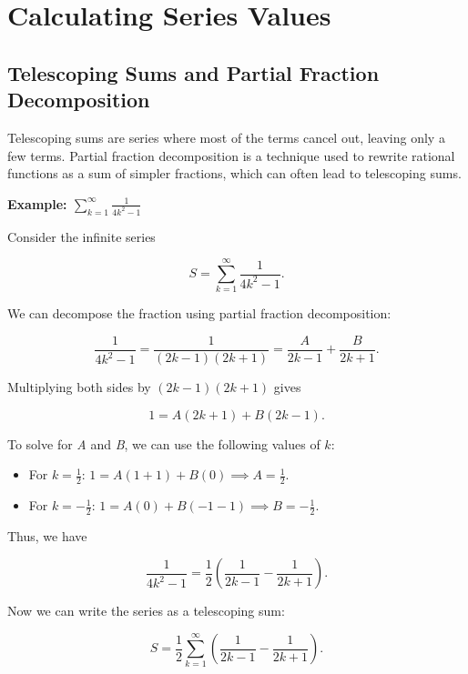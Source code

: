 \newpage
\section{Calculating Series Values}

\subsection{Telescoping Sums and Partial Fraction Decomposition}

Telescoping sums are series where most of the terms cancel out, leaving only a few terms. Partial fraction decomposition is a technique used to rewrite rational functions as a sum of simpler fractions, which can often lead to telescoping sums.
\vspace{\baselineskip}

\textbf{Example: \(\sum_{k=1}^{\infty} \frac{1}{4k^2 - 1}\)}
\vspace{\baselineskip}

Consider the infinite series

\[
    S = \sum_{k=1}^{\infty} \frac{1}{4k^2 - 1}.
\]

We can decompose the fraction using partial fraction decomposition:

\[
    \frac{1}{4k^2 - 1} = \frac{1}{(2k - 1)(2k + 1)} = \frac{A}{2k - 1} + \frac{B}{2k + 1}.
\]

Multiplying both sides by \((2k - 1)(2k + 1)\) gives

\[
    1 = A(2k + 1) + B(2k - 1).
\]

To solve for \emph{A} and \emph{B}, we can use the following values of \(k\):

\begin{itemize}

    \item For \(k = \frac{1}{2}\): \(1 = A(1 + 1) + B(0) \implies A = \frac{1}{2}\).

    \item For \(k = -\frac{1}{2}\): \(1 = A(0) + B(-1 - 1) \implies B = -\frac{1}{2}\).

\end{itemize}

Thus, we have

\[
    \frac{1}{4k^2 - 1} = \frac{1}{2} \left( \frac{1}{2k - 1} - \frac{1}{2k + 1} \right).
\]

Now we can write the series as a telescoping sum:

\[
    S = \frac{1}{2} \sum_{k=1}^{\infty} \left( \frac{1}{2k - 1} - \frac{1}{2k + 1} \right).
\]

